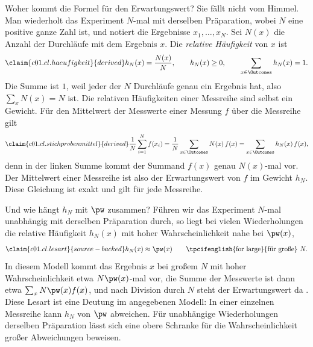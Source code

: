 Woher kommt die Formel für den Erwartungswert? Sie fällt nicht vom Himmel. Man wiederholt
das Experiment $N$-mal mit
derselben Präparation, wobei $N$ eine positive ganze Zahl ist, und notiert die Ergebnisse
$x_1, \dots, x_N$. Sei $N(x)$ die Anzahl
der Durchläufe mit dem Ergebnis $x$. Die \emph{relative Häufigkeit} von $x$ ist
\begin{equation}\label{c01.eq.haeufigkeit}\claim{c01.cl.haeufigkeit}{derived}
  h_N(x) = \frac{N(x)}{N},
  \qquad
  h_N(x) \geq 0,
  \qquad
  \sum_{x \in \Outcomes} h_N(x) = 1 .
\end{equation}
Die Summe ist $1$, weil jeder der $N$ Durchläufe genau ein Ergebnis hat, also
$\sum_x N(x) = N$ ist. Die relativen Häufigkeiten einer Messreihe sind selbst ein Gewicht.
Für den Mittelwert der Messwerte einer Messung $f$ über die Messreihe gilt
\begin{equation}\label{c01.eq.stichprobenmittel}\claim{c01.cl.stichprobenmittel}{derived}
  \frac{1}{N} \sum_{i=1}^{N} f(x_i)
  = \frac{1}{N} \sum_{x \in \Outcomes} N(x)\, f(x)
  = \sum_{x \in \Outcomes} h_N(x)\, f(x) ,
\end{equation}
denn in der linken Summe kommt der Summand $f(x)$ genau $N(x)$-mal vor. Der Mittelwert
einer Messreihe ist also der Erwartungswert von $f$ im Gewicht $h_N$. Diese Gleichung ist
exakt und gilt für jede Messreihe.

Und wie hängt $h_N$ mit $\pw$ zusammen? Führen wir das Experiment $N$-mal unabhängig mit
derselben Präparation durch, so liegt bei vielen Wiederholungen die relative Häufigkeit
$h_N(x)$ mit hoher Wahrscheinlichkeit nahe bei $\pw(x)$,
\begin{equation}\label{c01.eq.lesart}\claim{c01.cl.lesart}{source-backed}
  h_N(x) \approx \pw(x)
  \qquad \text{\tpcifenglish{for large}{für große}}\ N .
\end{equation}
In diesem Modell kommt das Ergebnis $x$ bei großem $N$ mit hoher Wahrscheinlichkeit
etwa $N \pw(x)$-mal vor, die Summe der Messwerte ist dann etwa
$\sum_x N \pw(x) f(x)$, und nach Division durch $N$ steht der Erwartungswert da
. Diese Lesart ist
eine Deutung im angegebenen Modell: In einer einzelnen Messreihe kann $h_N$ von $\pw$
abweichen. Für unabhängige Wiederholungen derselben Präparation lässt sich eine obere
Schranke für die Wahrscheinlichkeit großer Abweichungen beweisen.

